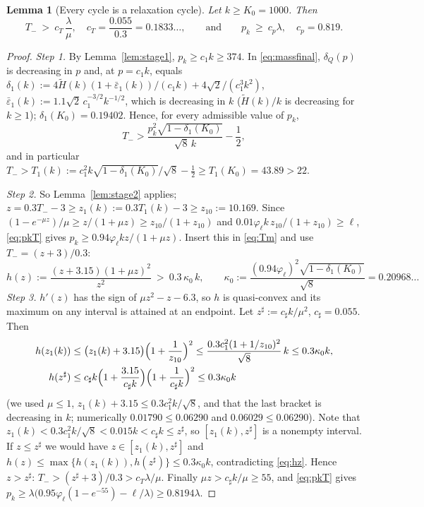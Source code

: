 \documentclass[11pt,a4paper]{article}
\newtheorem{lemma}[theorem]{Lemma}
\theoremstyle{remark}\newtheorem{remark}[theorem]{Remark}
\begin{document}
\begin{lemma}[Every cycle is a relaxation cycle]\label{lem:boot}
Let $k\ge K_0=1000$. Then
\[
T_-\ >\ c_T\,\frac{\lambda}{\mu},\quad c_T=\frac{0.055}{0.3}=0.1833\ldots,\qquad\text{and}\qquad
p_k\ \ge\ c_p\lambda,\quad c_p=0.819 .
\]
\end{lemma}
\begin{proof}
\emph{Step 1.} By Lemma~\ref{lem:stage1}, $p_k\ge c_1k\ge374$. In \eqref{eq:massfinal},
$\delta_Q(p)$ is decreasing in $p$ and, at $p=c_1k$, equals
$\delta_1(k):=4\tilde H(k)(1+\bar\varepsilon_1(k))/(c_1k)+4\sqrt2/(c_1^3k^2)$,
$\bar\varepsilon_1(k):=1.1\sqrt2\,c_1^{-3/2}k^{-1/2}$, which is decreasing in $k$ ($\tilde H(k)/k$ is
decreasing for $k\ge1$); $\delta_1(K_0)=0.19402$. Hence, for every admissible value of $p_k$,
\begin{equation}\label{eq:Tm}
T_->\frac{p_k^2\sqrt{1-\delta_1(K_0)}}{\sqrt8\,k}-\frac12 ,
\end{equation}
and in particular $T_->T_1(k):=c_1^2k\sqrt{1-\delta_1(K_0)}/\sqrt8-\tfrac12\ge T_1(K_0)=43.89>22$.

\emph{Step 2.} So Lemma~\ref{lem:stage2} applies; $z=0.3T_--3\ge z_1(k):=0.3T_1(k)-3\ge z_{10}:=10.169$.
Since $(1-e^{-\mu z})/\mu\ge z/(1+\mu z)\ge z_{10}/(1+z_{10})$ and
$0.01\varphi_\ell k\,z_{10}/(1+z_{10})\ge\ell$, \eqref{eq:pkT} gives
$p_k\ge0.94\varphi_\ell kz/(1+\mu z)$. Insert this in \eqref{eq:Tm} and use $T_-=(z+3)/0.3$:
\begin{equation}\label{eq:hz}
h(z):=\frac{(z+3.15)(1+\mu z)^2}{z^2}\ >\ 0.3\,\kappa_0\,k,\qquad
\kappa_0:=\frac{(0.94\varphi_\ell)^2\sqrt{1-\delta_1(K_0)}}{\sqrt8}=0.20968\ldots
\end{equation}
\emph{Step 3.} $h'(z)$ has the sign of $\mu z^2-z-6.3$, so $h$ is quasi-convex and its maximum on any
interval is attained at an endpoint. Let $z^\sharp:=c_\sharp k/\mu^2$, $c_\sharp=0.055$. Then
\begin{align*}
h(z_1(k))&\le\bigl(z_1(k)+3.15\bigr)\Bigl(1+\frac1{z_{10}}\Bigr)^2
\le\frac{0.3c_1^2(1+1/z_{10})^2}{\sqrt8}\,k\le0.3\kappa_0k,\\
h(z^\sharp)&\le c_\sharp k\Bigl(1+\frac{3.15}{c_\sharp k}\Bigr)\Bigl(1+\frac1{c_\sharp k}\Bigr)^2\le0.3\kappa_0k
\end{align*}
(we used $\mu\le1$, $z_1(k)+3.15\le0.3c_1^2k/\sqrt8$, and that the last bracket is decreasing in $k$;
numerically $0.01790\le0.06290$ and $0.06029\le0.06290$). Note that
$z_1(k)<0.3c_1^2k/\sqrt8<0.015k<c_\sharp k\le z^\sharp$, so $[z_1(k),z^\sharp]$ is a nonempty interval.
If $z\le z^\sharp$ we would have $z\in[z_1(k),z^\sharp]$ and $h(z)\le\max\{h(z_1(k)),h(z^\sharp)\}\le0.3\kappa_0k$,
contradicting \eqref{eq:hz}. Hence $z>z^\sharp$:
$T_->(z^\sharp+3)/0.3>c_T\lambda/\mu$. Finally $\mu z>c_\sharp k/\mu\ge55$, and \eqref{eq:pkT} gives
$p_k\ge\lambda\bigl(0.95\varphi_\ell(1-e^{-55})-\ell/\lambda\bigr)\ge0.8194\lambda$.
\end{proof}
\end{document}
